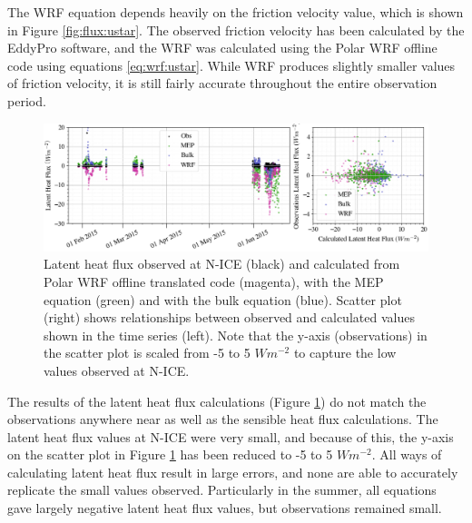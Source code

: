 The WRF equation depends heavily on the friction velocity value, which is shown in Figure \ref{fig:flux:ustar}. The observed friction velocity has been calculated by the EddyPro software, and the WRF was calculated using the Polar WRF offline code using equations \ref{eq:wrf:ustar}. While WRF produces slightly smaller values of friction velocity, it is still fairly accurate throughout the entire observation period. 

\begin{figure}[t]
    \centering
    \includegraphics[width=1\linewidth]{figures/chapter6/latent_wrf.png}
    \caption[Latent heat flux observed at N-ICE and calculated from Polar WRF offline translated code.]{Latent heat flux observed at N-ICE (black) and calculated from Polar WRF offline translated code (magenta), with the MEP equation (green) and with the bulk equation (blue). Scatter plot (right) shows relationships between observed and calculated values shown in the time series (left). Note that the y-axis (observations) in the scatter plot is scaled from -5 to 5 $Wm^{-2}$ to capture the low values observed at N-ICE.}
    \label{fig:flux:latent}
\end{figure}

The results of the latent heat flux calculations (Figure \ref{fig:flux:latent}) do not match the observations anywhere near as well as the sensible heat flux calculations. The latent heat flux values at N-ICE were very small, and because of this, the y-axis on the scatter plot in Figure \ref{fig:flux:latent} has been reduced to -5 to 5 $Wm^{-2}$. All ways of calculating latent heat flux result in large errors, and none are able to accurately replicate the small values observed. Particularly in the summer, all equations gave largely negative latent heat flux values, but observations remained small.

